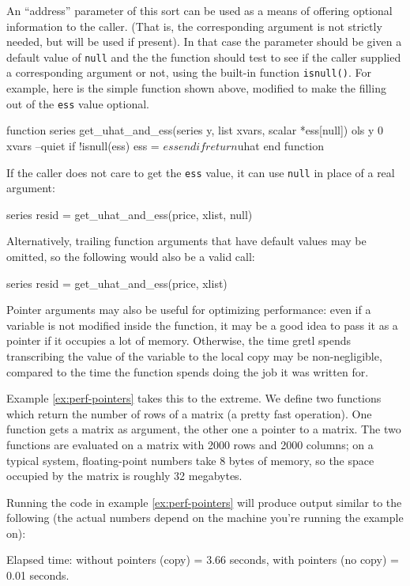 An ``address'' parameter of this sort can be used as a means of
offering optional information to the caller.  (That is, the
corresponding argument is not strictly needed, but will be used if
present).  In that case the parameter should be given a default value
of \texttt{null} and the the function should test to see if the caller
supplied a corresponding argument or not, using the built-in function
\texttt{isnull()}.  For example, here is the simple function shown
above, modified to make the filling out of the \texttt{ess} value
optional.
%
\begin{code}
function series get_uhat_and_ess(series y, list xvars, scalar *ess[null])
  ols y 0 xvars --quiet
  if !isnull(ess) 
     ess = $ess
  endif
  return $uhat
end function
\end{code}
%
If the caller does not care to get the \texttt{ess} value, it can
use \texttt{null} in place of a real argument:
%
\begin{code}
series resid = get_uhat_and_ess(price, xlist, null)
\end{code}
%
Alternatively, trailing function arguments that have default values 
may be omitted, so the following would also be a valid call:
%
\begin{code}
series resid = get_uhat_and_ess(price, xlist)
\end{code}

Pointer arguments may also be useful for optimizing performance: even if
a variable is not modified inside the function, it may be a good idea
to pass it as a pointer if it occupies a lot of memory. Otherwise, the
time gretl spends transcribing the value of the variable to the
local copy may be non-negligible, compared to the time the function
spends doing the job it was written for.

Example \ref{ex:perf-pointers} takes this to the extreme.  We define
two functions which return the number of rows of a matrix (a pretty
fast operation).  One function gets a matrix as argument, the other
one a pointer to a matrix.  The two functions are evaluated on a
matrix with 2000 rows and 2000 columns; on a typical system,
floating-point numbers take 8 bytes of memory, so the space occupied
by the matrix is roughly 32 megabytes.

Running the code in example \ref{ex:perf-pointers} will produce output
similar to the following (the actual numbers depend on the
machine you're running the example on):
\begin{code}
Elapsed time: 
	without pointers (copy) = 3.66 seconds,
	with pointers (no copy) = 0.01 seconds.
\end{code}

